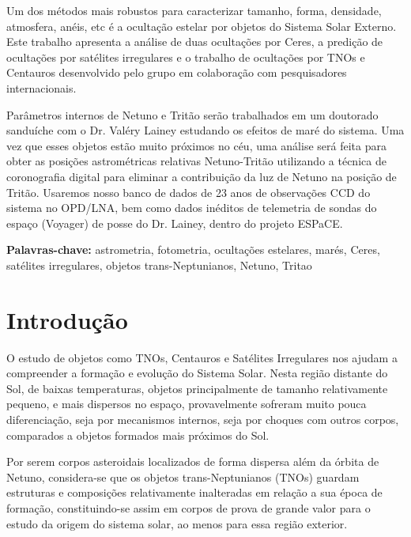 \documentclass[12pt,a4paper]{monografia}
\begin{document}
Um dos métodos mais robustos para caracterizar tamanho, forma, densidade, atmosfera, anéis, etc é a ocultação estelar por objetos do Sistema Solar Externo. Este trabalho apresenta a análise de duas ocultações por Ceres, a predição de ocultações por satélites irregulares e o trabalho de ocultações por TNOs e Centauros desenvolvido pelo grupo em colaboração com pesquisadores internacionais.

Parâmetros internos de Netuno e Tritão serão trabalhados em um doutorado sanduíche com o Dr. Valéry Lainey estudando os efeitos de maré do sistema. Uma vez que esses objetos estão muito próximos no céu, uma análise será feita para obter as posições astrométricas relativas Netuno-Tritão utilizando a técnica de coronografia digital para eliminar a contribuição da luz de Netuno na posição de Tritão. Usaremos nosso banco de dados de 23 anos de observações CCD do sistema no OPD/LNA, bem como dados inéditos de telemetria de sondas do espaço (Voyager) de posse do Dr. Lainey, dentro do projeto ESPaCE.

\par
\vspace{1em}
\noindent\textbf{Palavras-chave:} astrometria, fotometria, ocultações estelares, marés, Ceres, satélites irregulares, objetos trans-Neptunianos, Netuno, Tritao


\tableofcontents %
\thispagestyle{empty} %

\pagestyle{ruledheader}

\chapter{Introdução}
\label{Cap: intro}

\indent \indent O estudo de objetos como TNOs, Centauros e Satélites Irregulares nos ajudam a compreender a formação e evolução do Sistema Solar. Nesta região distante do Sol, de baixas temperaturas, objetos principalmente de tamanho relativamente pequeno, e mais dispersos no espaço, provavelmente sofreram muito pouca diferenciação, seja por mecanismos internos, seja por choques com outros corpos, comparados a objetos formados mais próximos do Sol.

Por serem corpos asteroidais localizados de forma dispersa além da órbita de Netuno, considera-se que os objetos trans-Neptunianos (TNOs) guardam estruturas e composições relativamente inalteradas em relação a sua época de formação, constituindo-se assim em corpos de prova de grande valor para o estudo da origem do sistema solar, ao menos para essa região exterior.
\end{document}

